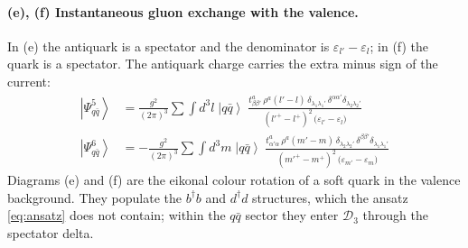 \documentclass[11pt]{article}
\newcommand{\ibar}[2]{\draw[line width=1.1pt] (#1-0.13,#2) -- (#1+0.13,#2);}
\newcommand{\eps}{\varepsilon}
\newcommand{\dg}{\dagger}
\newcommand{\ket}[1]{\left|#1\right\rangle}
\newcommand{\qk}[3]{q^{#1}_{#2}(#3)}
\newcommand{\aqk}[3]{\bar q^{#1}_{#2}(#3)}
\newcommand{\D}{\mathcal{D}}
\begin{document}
\paragraph{(e), (f) Instantaneous gluon exchange with the valence.}
\begin{center}
\hspace{0.7cm}
\end{center}
In (e) the antiquark is a spectator and the denominator is $\eps_{l'}-\eps_{l}$; in (f) the quark
is a spectator. The antiquark charge carries the extra minus sign of the current:
\begin{align}
\ket{\Psi^{5}_{q\bar q}}&=\frac{g^{2}}{(2\pi)^{3}}\sum\int\!d^{3}l\;\ket{q\bar q}\;
\frac{t^{a}_{\beta\beta'}\,\rho^{a}(l'-l)\,\delta_{\lambda_{1}\lambda_{1}'}\,
\delta^{\alpha\alpha'}\delta_{\lambda_{2}\lambda_{2}'}}
{(l'^{+}-l^{+})^{2}\,\big(\eps_{l'}-\eps_{l}\big)}
\label{eq:E1e}\\
\ket{\Psi^{6}_{q\bar q}}&=-\frac{g^{2}}{(2\pi)^{3}}\sum\int\!d^{3}m\;\ket{q\bar q}\;
\frac{t^{a}_{\alpha'\alpha}\,\rho^{a}(m'-m)\,\delta_{\lambda_{2}\lambda_{2}'}\,
\delta^{\beta\beta'}\delta_{\lambda_{1}\lambda_{1}'}}
{(m'^{+}-m^{+})^{2}\,\big(\eps_{m'}-\eps_{m}\big)}
\label{eq:E1f}
\end{align}
Diagrams (e) and (f) are the eikonal colour rotation of a soft quark in the valence background.
They populate the $b^{\dg}b$ and $d^{\dg}d$ structures, which the ansatz \eqref{eq:ansatz} does
not contain; within the $q\bar q$ sector they enter $\D_{3}$ through the spectator delta.
\end{document}
